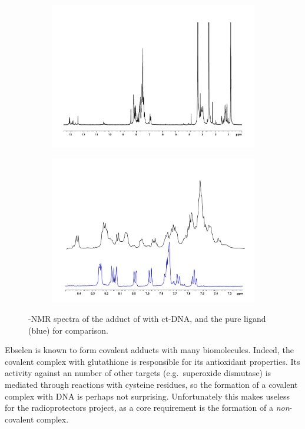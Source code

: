 \begin{refsection}
\begin{figure}
    \centering
    \begin{subfigure}{\linewidth}
        \centering
        \includegraphics[width=0.8\linewidth]{Figures/ebshoe-dna-adduct-full.pdf}
        \caption{}
    \end{subfigure}
    \begin{subfigure}{\linewidth}
        \centering
        \includegraphics[width=0.8\linewidth]{Figures/ebshoe-dna-adduct-aromatic.pdf}
        \caption{}
    \end{subfigure}
    \caption{-NMR spectra of the adduct of  with ct-DNA, and the pure ligand (blue) for comparison.}\label{fig:ebshoe-dna-adduct}

\end{figure}

Ebselen is known to form covalent adducts with many biomolecules.
Indeed, the covalent complex with glutathione is responsible for its antioxidant properties.\autocite{Antony2011}
Its activity against an number of other targets (e.g.\ superoxide dismutase\autocite{Capper2018}) is mediated through reactions with cysteine residues, so the formation of a covalent complex with DNA is perhaps not surprising.
Unfortunately this makes  useless for the radioprotectors project, as a core requirement is the formation of a \emph{non}-covalent complex.


\end{refsection}
